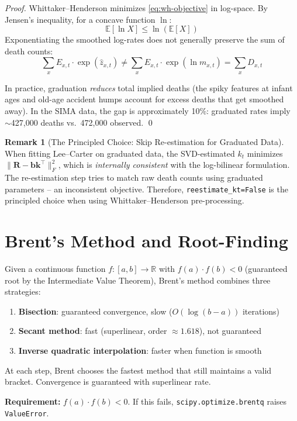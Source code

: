 \documentclass[11pt,a4paper]{article}
\theoremstyle{definition}
\newtheorem{remark}[theorem]{Remark}
\newcommand{\R}{\mathbb{R}}
\newcommand{\E}{\mathbb{E}}
\begin{document}
\begin{proof}
Whittaker--Henderson minimizes \eqref{eq:wh-objective} in log-space.
By Jensen's inequality, for a concave function $\ln$:
\[
  \E[\ln X] \leq \ln(\E[X])
\]
Exponentiating the smoothed log-rates does not generally preserve
the sum of death counts:
\[
  \sum_x E_{x,t} \cdot \exp(\hat{z}_{x,t})
  \neq \sum_x E_{x,t} \cdot \exp(\ln m_{x,t})
  = \sum_x D_{x,t}
\]

In practice, graduation \emph{reduces} total implied deaths (the spiky
features at infant ages and old-age accident humps account for excess
deaths that get smoothed away). In the SIMA data, the gap is approximately
10\%: graduated rates imply $\sim$427{,}000 deaths vs.\ 472{,}000 observed. \qed
\end{proof}

\begin{remark}[The Principled Choice: Skip Re-estimation for Graduated Data]
When fitting Lee--Carter on graduated data, the SVD-estimated $k_t$
minimizes $\|\bm{R} - \bm{b}\bm{k}^\top\|_F^2$, which is \emph{internally
consistent} with the log-bilinear formulation. The re-estimation step
tries to match raw death counts using graduated parameters -- an
inconsistent objective. Therefore, \texttt{reestimate\_kt=False} is
the principled choice when using Whittaker--Henderson pre-processing.
\end{remark}

\section{Brent's Method and Root-Finding}
\label{sec:brent}

\begin{formaldef}
Given a continuous function $f: [a, b] \to \R$ with $f(a) \cdot f(b) < 0$
(guaranteed root by the Intermediate Value Theorem), Brent's method
combines three strategies:
\begin{enumerate}
  \item \textbf{Bisection}: guaranteed convergence, slow ($O(\log(b-a))$ iterations)
  \item \textbf{Secant method}: fast (superlinear, order $\approx 1.618$), not guaranteed
  \item \textbf{Inverse quadratic interpolation}: faster when function is smooth
\end{enumerate}

At each step, Brent chooses the fastest method that still maintains
a valid bracket. Convergence is guaranteed with superlinear rate.

\textbf{Requirement:} $f(a) \cdot f(b) < 0$. If this fails,
\texttt{scipy.optimize.brentq} raises \texttt{ValueError}.
\end{formaldef}
\end{document}
